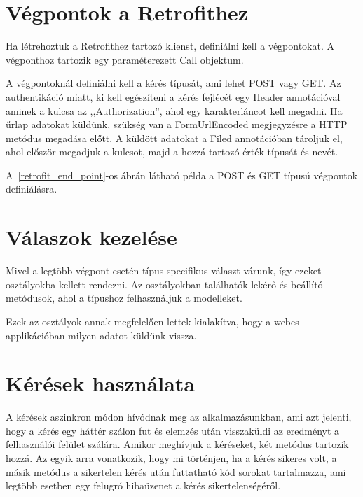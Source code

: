 \documentclass[
]{thesis-ekf}
\theoremstyle{definition}
\theoremstyle{remark}
\begin{document}
	\section{Végpontok a Retrofithez}
	Ha létrehoztuk a Retrofithez tartozó klienst, definiálni kell a végpontokat. A végponthoz tartozik egy paraméterezett Call objektum.
	
	A végpontoknál definiálni kell a kérés típusát, ami lehet POST vagy GET. Az authentikáció miatt, ki kell egészíteni a kérés fejlécét egy Header annotációval aminek a kulcsa az ,,Authorization'', ahol egy karakterláncot kell megadni. Ha űrlap adatokat küldünk, szükség van a FormUrlEncoded megjegyzésre a HTTP metódus megadása előtt. A küldött adatokat a Filed annotációban tároljuk el, ahol először megadjuk a kulcsot, majd a hozzá tartozó érték típusát és nevét.
	
	A~\ref{retrofit_end_point}-os ábrán látható példa a POST és GET típusú végpontok definiálásra.
	
	
	
	\section{Válaszok kezelése}
	Mivel a legtöbb végpont esetén típus specifikus választ várunk, így ezeket osztályokba kellett rendezni. Az osztályokban találhatók lekérő és beállító metódusok, ahol a típushoz felhasználjuk a modelleket.
	
	Ezek az osztályok annak megfelelően lettek kialakítva, hogy a webes applikációban milyen adatot küldünk vissza.
	
	\section{Kérések használata}
	A kérések aszinkron módon hívódnak meg az alkalmazásunkban, ami azt jelenti, hogy a kérés egy háttér szálon fut és elemzés után visszaküldi az eredményt a felhasználói felület szálára. Amikor meghívjuk a kéréseket, két metódus tartozik hozzá. Az egyik arra vonatkozik, hogy mi történjen, ha a kérés sikeres volt, a másik metódus a sikertelen kérés után futtatható kód sorokat tartalmazza, ami legtöbb esetben egy felugró hibaüzenet a kérés sikertelenségéről.
	
\end{document}
